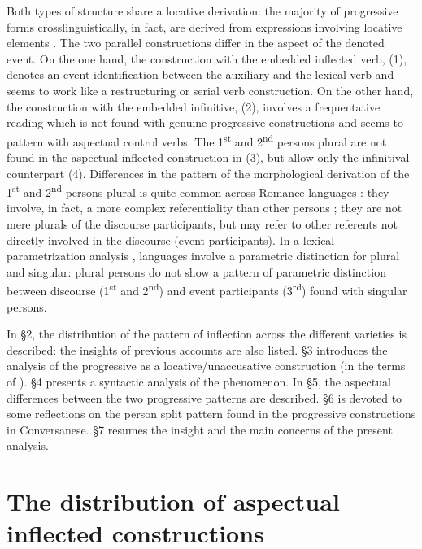 \documentclass[output=paper]{langsci/langscibook}
\begin{document}
Both types of structure share a locative derivation: the majority of progressive forms crosslinguistically, in fact, are derived from expressions involving locative elements  \citep{Bybee1994,Mateu1999,Laka2006}. The two parallel constructions differ in the aspect of the denoted event. On the one hand, the construction with the embedded inflected verb, (1), denotes an event identification between the auxiliary and the lexical verb and seems to work like a restructuring or serial verb construction. On the other hand, the construction with the embedded infinitive, (2), involves a frequentative reading which is not found with genuine progressive constructions \citep{Chierchia1995} and seems to pattern with aspectual control verbs. The 1\textsuperscript{st} and 2\textsuperscript{nd} persons plural are not found in the aspectual inflected construction in (3), but allow only the infinitival counterpart (4). Differences in the pattern of the morphological derivation of the 1\textsuperscript{st} and 2\textsuperscript{nd} persons plural is quite common across Romance languages \citep{Manzini2005,Manzini2011Bio}: they involve, in fact, a more complex referentiality than other persons \citep{Bobaljik2008Missing}; they are not mere plurals of the discourse participants, but may refer to other referents not directly involved in the discourse (event participants). In a lexical parametrization analysis \citep{Manzini2011Bio}, languages involve a parametric distinction for plural and singular: plural persons do not show a pattern of parametric distinction between discourse (1\textsuperscript{st} and 2\textsuperscript{nd}) and event participants (3\textsuperscript{rd}) found with singular persons. 

In §2, the distribution of the pattern of inflection across the different varieties is described: the insights of previous accounts are also listed. §3 introduces the analysis of the progressive as a locative\slash unaccusative construction (in the terms of \citealt{Mateu1999}). §4 presents a syntactic analysis of the phenomenon. In §5, the aspectual differences between the two progressive patterns are described. §6 is devoted to some reflections on the person split pattern found in the progressive constructions in Conversanese. §7 resumes the insight and the main concerns of the present analysis. 

\section{The distribution of aspectual inflected constructions}%
\end{document}
